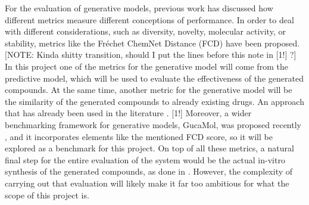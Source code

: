 \documentclass{article}
\begin{document}
For the evaluation of generative models, previous work \cite{Theis2016} has discussed
 how different metrics measure different conceptions of performance. In order to deal
 with different considerations, such as diversity, novelty, molecular activity, or
 stability, metrics like the Fréchet ChemNet Distance (FCD) \cite{Preuer} have been
 proposed. {\color{red}[NOTE: Kinda shitty transition, should I put the lines before
 this note in [1!] ?]} In this project one of the metrics for the generative model will
 come from the predictive model, which will be used to evaluate the effectiveness of the
 generated compounds. At the same time, another metric for the generative model will be
 the similarity of the generated compounds to already existing drugs. An approach that
 has already been used in the literature \cite{Born2019}. {\color{red}[1!]} Moreover, a
 wider benchmarking framework for generative models, GucaMol, was proposed recently
 \cite{Brown2019}, {\color{red} and it incorporates elements like the mentioned FCD
 score, so it will be explored as a benchmark for this project}. On top of all these
 metrics, a natural final step for the entire evaluation of the system would be the
 actual in-vitro synthesis of the generated compounds, as done in
 \cite{Zhavoronkov2019}. However, the complexity of carrying out that evaluation will
 likely make it far too ambitious for what the scope of this project is.
 









    
\end{document}
